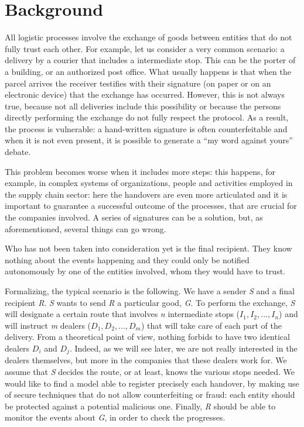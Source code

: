 \chapter{Background}
\label{cha:background}

All logistic processes involve the exchange of goods between entities that do not fully trust each other. For example, let us consider a very common scenario: a delivery by a courier that includes a intermediate stop. This can be the porter of a building, or an authorized post office. What usually happens is that when the parcel arrives the receiver testifies with their signature (on paper or on an electronic device) that the exchange has occurred. However, this is not always true, because not all deliveries include this possibility or because the persons directly performing the exchange do not fully respect the protocol. As a result, the process is vulnerable: a hand-written signature is often counterfeitable and when it is not even present, it is possible to generate a ``my word against yours'' debate.

This problem becomes worse when it includes more steps: this happens, for example, in complex systems of organizations, people and activities employed in the supply chain sector: here the handovers are even more articulated and it is important to guarantee a successful outcome of the processes, that are crucial for the companies involved. A series of signatures can be a solution, but, as aforementioned, several things can go wrong.

Who has not been taken into consideration yet is the final recipient. They know nothing about the events happening and they could only be notified autonomously by one of the entities involved, whom they would have to trust. 

Formalizing, the typical scenario is the following. We have a sender \textit{S} and a final recipient \textit{R}. \textit{S} wants to send \textit{R} a particular good, \textit{G}. To perform the exchange, \textit{S} will designate a certain route that involves \textit{n} intermediate stops ($I_1, I_2, ..., I_n$) and will instruct \textit{m} dealers ($D_1, D_2, ..., D_m$) that will take care of each part of the delivery. From a theoretical point of view, nothing forbids to have two identical dealers $D_i$ and $D_j$. Indeed, as we will see later, we are not really interested in the dealers themselves, but more in the companies that these dealers work for. We assume that \textit{S} decides the route, or at least, knows the various stops needed. We would like to find a model able to register precisely each handover, by making use of secure techniques that do not allow counterfeiting or fraud: each entity should be protected against a potential malicious one. Finally, \textit{R} should be able to monitor the events about \textit{G}, in order to check the progresses.

